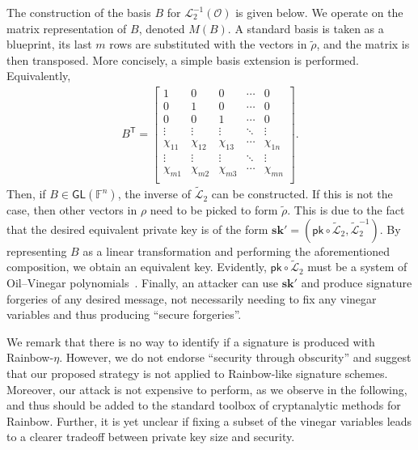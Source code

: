 \documentclass[12pt, a4paper, oneside]{memoir}
\theoremstyle{definition}
\begin{document}
The construction of the basis $B$ for $\mathcal{L}_{2}^{-1}(\mathcal{O})$ is given below. We operate on the matrix representation of $B$, denoted $M(B)$. A standard basis is taken as a blueprint, its last $m$ rows are substituted with the vectors in $\widetilde{\rho}$, and the matrix is then transposed. More concisely, a simple basis extension is performed. Equivalently,
\begin{align}
  B^{\mathsf{T}} = \begin{bmatrix}
    1 & 0 & 0 & \cdots & 0 \\
    0 & 1 & 0 & \cdots & 0 \\
    0 & 0 & 1 & \cdots & 0 \\
    \vdots & \vdots & \vdots & \ddots & \vdots \\
    \chi_{11} & \chi_{12} & \chi_{13} & \cdots & \chi_{1n} \\
        \vdots & \vdots & \vdots & \ddots & \vdots \\
    \chi_{m1} & \chi_{m2} & \chi_{m3} & \cdots & \chi_{mn} \\
  \end{bmatrix}.
\end{align}
Then, if $B \in \mathsf{GL}(\mathbb{F}^{n})$, the inverse of $\widetilde{\mathcal{L}}_{2}$ can be constructed. If this is not the case, then other vectors in $\rho$ need to be picked to form $\widetilde{\rho}$. This is due to the fact that the desired equivalent private key is of the form $\mathbf{sk'} = (\mathsf{pk} \circ \widetilde{\mathcal{L}}_{2}, \widetilde{\mathcal{L}}_{2}^{-1})$. By representing $B$ as a linear transformation and performing the aforementioned composition, we obtain an equivalent key. Evidently, $\mathsf{pk} \circ \widetilde{\mathcal{L}}_{2}$ must be a system of Oil--Vinegar polynomials~\cite[Theorem 1]{Beullens:201706}. Finally, an attacker can use $\mathbf{sk'}$ and produce signature forgeries of any desired message, not necessarily needing to fix any vinegar variables and thus producing ``secure forgeries''.

We remark that there is no way to identify if a signature is produced with Rainbow-$\eta$. However, we do not endorse ``security through obscurity'' and suggest that our proposed strategy is not applied to Rainbow-like signature schemes. Moreover, our attack is not expensive to perform, as we observe in the following, and thus should be added to the standard toolbox of cryptanalytic methods for Rainbow. Further, it is yet unclear if fixing a subset of the vinegar variables leads to a clearer tradeoff between private key size and security.





\end{document}
